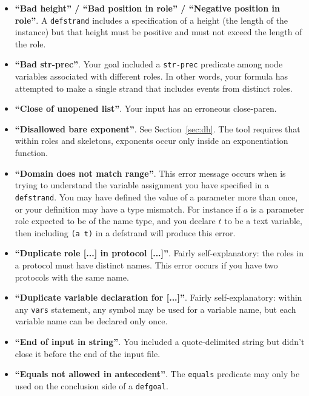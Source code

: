 \begin{itemize}
\item \textbf{``Bad height'' / ``Bad position in role'' / ``Negative
  position in role''}.  A \texttt{defstrand} includes a specification
  of a height (the length of the instance) but that height must be
  positive and must not exceed the length of the role.

\item \textbf{``Bad str-prec''}.  Your goal included a
  \texttt{str-prec} predicate among node variables associated with
  different roles.  In other words, your formula has attempted to make
  a single strand that includes events from distinct roles.

\item \textbf{``Close of unopened list''}.  Your input has an erroneous
  close-paren.

\item \textbf{``Disallowed bare exponent''}.  See Section~\ref{sec:dh}.
  The tool requires that within roles and skeletons, exponents occur only
  inside an exponentiation function.

\item \textbf{``Domain does not match range''}.  This error message
  occurs when {\cpsa} is trying to understand the variable assignment
  you have specified in a \texttt{defstrand}.  You may have defined
  the value of a parameter more than once, or your definition may have
  a type mismatch.  For instance if $a$ is a parameter role expected
  to be of the name type, and you declare $t$ to be a text variable,
  then including \texttt{(a t)} in a defstrand will produce this
  error.

\item \textbf{``Duplicate role [...] in protocol [...]''}.  Fairly
  self-explanatory: the roles in a protocol must have distinct names.
  This error occurs if you have two protocols with the same name.

\item \textbf{``Duplicate variable declaration for [...]''}.  Fairly
  self-explanatory: within any \texttt{vars} statement, any symbol may
  be used for a variable name, but each variable name can be declared only once.

\item \textbf{``End of input in string''}.  You included a quote-delimited
  string but didn't close it before the end of the input file.

\item \textbf{``Equals not allowed in antecedent''}.  The \texttt{equals}
  predicate may only be used on the conclusion side of a \texttt{defgoal}.


\end{itemize}
